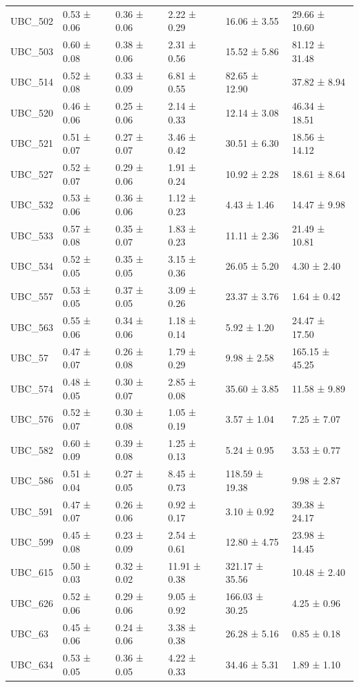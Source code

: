 \begin{tabular}{llllll}
UBC_502 & 0.53 ± 0.06 & 0.36 ± 0.06 & 2.22 ± 0.29 & 16.06 ± 3.55 & 29.66 ± 10.60 \\
UBC_503 & 0.60 ± 0.08 & 0.38 ± 0.06 & 2.31 ± 0.56 & 15.52 ± 5.86 & 81.12 ± 31.48 \\
UBC_514 & 0.52 ± 0.08 & 0.33 ± 0.09 & 6.81 ± 0.55 & 82.65 ± 12.90 & 37.82 ± 8.94 \\
UBC_520 & 0.46 ± 0.06 & 0.25 ± 0.06 & 2.14 ± 0.33 & 12.14 ± 3.08 & 46.34 ± 18.51 \\
UBC_521 & 0.51 ± 0.07 & 0.27 ± 0.07 & 3.46 ± 0.42 & 30.51 ± 6.30 & 18.56 ± 14.12 \\
UBC_527 & 0.52 ± 0.07 & 0.29 ± 0.06 & 1.91 ± 0.24 & 10.92 ± 2.28 & 18.61 ± 8.64 \\
UBC_532 & 0.53 ± 0.06 & 0.36 ± 0.06 & 1.12 ± 0.23 & 4.43 ± 1.46 & 14.47 ± 9.98 \\
UBC_533 & 0.57 ± 0.08 & 0.35 ± 0.07 & 1.83 ± 0.23 & 11.11 ± 2.36 & 21.49 ± 10.81 \\
UBC_534 & 0.52 ± 0.05 & 0.35 ± 0.05 & 3.15 ± 0.36 & 26.05 ± 5.20 & 4.30 ± 2.40 \\
UBC_557 & 0.53 ± 0.05 & 0.37 ± 0.05 & 3.09 ± 0.26 & 23.37 ± 3.76 & 1.64 ± 0.42 \\
UBC_563 & 0.55 ± 0.06 & 0.34 ± 0.06 & 1.18 ± 0.14 & 5.92 ± 1.20 & 24.47 ± 17.50 \\
UBC_57 & 0.47 ± 0.07 & 0.26 ± 0.08 & 1.79 ± 0.29 & 9.98 ± 2.58 & 165.15 ± 45.25 \\
UBC_574 & 0.48 ± 0.05 & 0.30 ± 0.07 & 2.85 ± 0.08 & 35.60 ± 3.85 & 11.58 ± 9.89 \\
UBC_576 & 0.52 ± 0.07 & 0.30 ± 0.08 & 1.05 ± 0.19 & 3.57 ± 1.04 & 7.25 ± 7.07 \\
UBC_582 & 0.60 ± 0.09 & 0.39 ± 0.08 & 1.25 ± 0.13 & 5.24 ± 0.95 & 3.53 ± 0.77 \\
UBC_586 & 0.51 ± 0.04 & 0.27 ± 0.05 & 8.45 ± 0.73 & 118.59 ± 19.38 & 9.98 ± 2.87 \\
UBC_591 & 0.47 ± 0.07 & 0.26 ± 0.06 & 0.92 ± 0.17 & 3.10 ± 0.92 & 39.38 ± 24.17 \\
UBC_599 & 0.45 ± 0.08 & 0.23 ± 0.09 & 2.54 ± 0.61 & 12.80 ± 4.75 & 23.98 ± 14.45 \\
UBC_615 & 0.50 ± 0.03 & 0.32 ± 0.02 & 11.91 ± 0.38 & 321.17 ± 35.56 & 10.48 ± 2.40 \\
UBC_626 & 0.52 ± 0.06 & 0.29 ± 0.06 & 9.05 ± 0.92 & 166.03 ± 30.25 & 4.25 ± 0.96 \\
UBC_63 & 0.45 ± 0.06 & 0.24 ± 0.06 & 3.38 ± 0.38 & 26.28 ± 5.16 & 0.85 ± 0.18 \\
UBC_634 & 0.53 ± 0.05 & 0.36 ± 0.05 & 4.22 ± 0.33 & 34.46 ± 5.31 & 1.89 ± 1.10 \\

\end{tabular}
